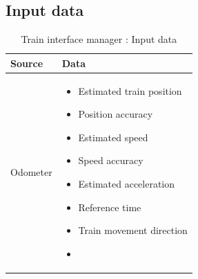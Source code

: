 \documentclass[nocc]{template/openetcs_report}
\begin{document}
\subsection{Input data}
			\begin{longtable}{|l|l|}
				\caption{Train interface manager : Input data}\\ 
				\hline
				
					\begin{minipage}[t]{0.35\linewidth} \textbf{Source}	\end{minipage} 
				&	\begin{minipage}[t]{0.65\linewidth} \textbf{Data} \end{minipage} \\
				
				\hline
																																									
					\begin{minipage}[t]{0.35\linewidth} Odometer	\end{minipage} 
				&	\begin{minipage}[t]{0.65\linewidth}
						\begin{itemize}
							\item Estimated train position
							\item Position accuracy
							\item Estimated speed
							\item Speed accuracy
							\item Estimated acceleration
							\item Reference time
							\item Train movement direction
							\item 
						\end{itemize}
					\end{minipage} \\
				
				\hline
				

\end{longtable}
\end{document}
